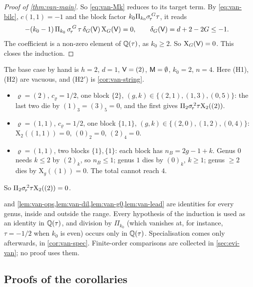 \begin{proof}[Proof of \cref{thm:van-main}]
So \eqref{eq:van-Mk} reduces to its target term. By \eqref{eq:van-bilc}, $c(1,1)=-1$ and the block factor $k_0\Pi_{k_0}\sigma_{\!\tau}^{\,G}\tau$, it reads
\[
-(k_0-1)\,\Pi_{k_0}\,\sigma_{\!\tau}^{\,G}\,\tau\,\delta_G(\mathsf{V})\,\mathrm{X}_G(\mathsf{V})=0,\qquad\delta_G(\mathsf{V})=d+2-2G\leq-1.
\]
The coefficient is a non-zero element of $\mathbb{Q}(\tau)$, as $k_0\geq 2$. So $\mathrm{X}_G(\mathsf{V})=0$. This closes the induction.
\end{proof}

\begin{rmk}
The base case by hand is $h=2$, $d=1$, $\mathsf{V}=(2)$, $\mathsf{M}=\emptyset$, $k_0=2$, $n=4$. Here (H1), (H2) are vacuous, and (H2$'$) is \cref{cor:van-string}.
\begin{itemize}
\item $\varrho=(2)$, $c_\varrho=1/2$, one block $\{2\}$, $(g,k)\in\{(2,1),(1,3),(0,5)\}$: the last two die by $(1)_3=(3)_5=0$, and the first gives $\Pi_2\sigma_{\!\tau}^{\,2}\tau\mathrm{X}_2((2))$.
\item $\varrho=(1,1)$, $c_\varrho=1/2$, one block $\{1,1\}$, $(g,k)\in\{(2,0),(1,2),(0,4)\}$: $\mathrm{X}_2((1,1))=0$, $(0)_2=0$, $(2)_4=0$.
\item $\varrho=(1,1)$, two blocks $\{1\},\{1\}$: each block has $n_B=2g-1+k$. Genus $0$ needs $k\leq 2$ by $(2)_k$, so $n_B\leq 1$; genus $1$ dies by $(0)_k$, $k\geq 1$; genus $\geq 2$ dies by $\mathrm{X}_g((1))=0$. The total cannot reach $4$.
\end{itemize}
So $\Pi_2\sigma_{\!\tau}^{\,2}\tau\mathrm{X}_2((2))=0$.
\end{rmk}

\begin{rmk}
 and \cref{lem:van-ops,lem:van-dil,lem:van-g0,lem:van-lead} are identities for every genus, inside and outside the range. Every hypothesis of the induction is used as an identity in $\mathbb{Q}(\tau)$, and division by $\Pi_{k_0}$ (which vanishes at, for instance, $\tau=-1/2$ when $k_0$ is even) occurs only in $\mathbb{Q}(\tau)$. Specialisation comes only afterwards, in \cref{cor:van-spec}. Finite-order comparisons are collected in \cref{sec:evi-van}; no proof uses them.
\end{rmk}

\subsection{Proofs of the corollaries}
\label{sec:van-cors}

